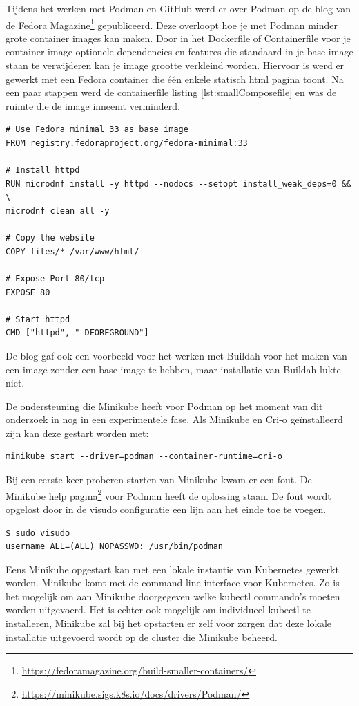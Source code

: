 Tijdens het werken met Podman en GitHub werd er over Podman op de blog van de Fedora Magazine\footnote{\url{https://fedoramagazine.org/build-smaller-containers/}} gepubliceerd. Deze overloopt hoe je met Podman minder grote container images kan maken. Door in het Dockerfile of Containerfile voor je container image optionele dependencies en features die standaard in je base image staan te verwijderen kan je image grootte verkleind worden. Hiervoor is werd er gewerkt met een Fedora container die één enkele statisch html pagina toont. Na een paar stappen werd de containerfile listing \ref{lst:smallComposefile} en was de ruimte die de image inneemt verminderd.
\begin{lstlisting}[caption=inhoud van een containerfile die door een kleinere base en het weglaten van dependancies minder ruimte inneemt,label=lst:smallComposefile]
# Use Fedora minimal 33 as base image
FROM registry.fedoraproject.org/fedora-minimal:33

# Install httpd
RUN microdnf install -y httpd --nodocs --setopt install_weak_deps=0 && \
microdnf clean all -y

# Copy the website
COPY files/* /var/www/html/

# Expose Port 80/tcp
EXPOSE 80

# Start httpd
CMD ["httpd", "-DFOREGROUND"]
\end{lstlisting}

De blog gaf ook een voorbeeld voor het werken met Buildah voor het maken van een image zonder een base image te hebben, maar installatie van Buildah lukte niet.

De ondersteuning die Minikube heeft voor Podman op het moment van dit onderzoek in nog in een experimentele fase. Als Minikube en Cri-o geïnstalleerd zijn kan deze gestart worden met:
\begin{verbatim}
minikube start --driver=podman --container-runtime=cri-o
\end{verbatim}
Bij een eerste keer proberen starten van Minikube kwam er een fout. De Minikube help pagina\footnote{\url{https://minikube.sigs.k8s.io/docs/drivers/Podman/}} voor Podman heeft de oplossing staan. De fout wordt opgelost door in de visudo configuratie een lijn aan het einde toe te voegen.
\begin{verbatim}
$ sudo visudo
username ALL=(ALL) NOPASSWD: /usr/bin/podman
\end{verbatim}

Eens Minikube opgestart kan met een lokale instantie van Kubernetes gewerkt worden. Minikube komt met de command line interface voor Kubernetes. Zo is het mogelijk om aan Minikube doorgegeven welke kubectl commando’s moeten worden uitgevoerd. Het is echter ook mogelijk om individueel kubectl te installeren, Minikube zal bij het opstarten er zelf voor zorgen dat deze lokale installatie uitgevoerd wordt op de cluster die Minikube beheerd.

